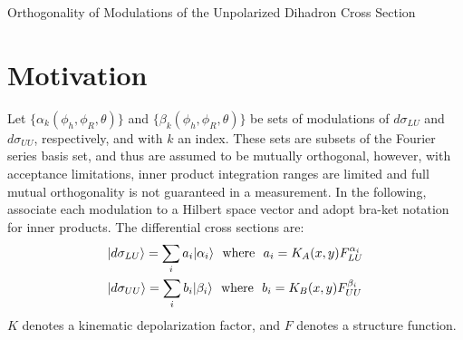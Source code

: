 \documentclass[12pt]{article}
\begin{document}
\begin{center}
{\LARGE 
Orthogonality of Modulations of the Unpolarized Dihadron Cross Section
}
\end{center}


\section*{Motivation}

Let $\{\alpha_k(\phi_h,\phi_R,\theta)\}$ and $\{\beta_k(\phi_h,\phi_R,\theta)\}$
be sets of modulations of $d\sigma_{LU}$ and $d\sigma_{UU}$, respectively, and
with $k$ an index. These sets are subsets of the Fourier series basis set, and
thus are assumed to be mutually orthogonal, however, with acceptance
limitations, inner product integration ranges are limited and full mutual
orthogonality is not guaranteed in a measurement. In the following, associate
each modulation to a Hilbert space vector and adopt bra-ket notation for inner
products. The differential cross sections are:
\begin{align}
\displaystyle
&|d\sigma_{LU}\rangle=\sum_{i}{a_i|\alpha_i\rangle}~ ~\text{where}~ ~
a_i=K_A(x,y)F_{LU}^{\alpha_i}\\
&|d\sigma_{UU}\rangle=\sum_{i}{b_i|\beta_i\rangle}~ ~\text{where}~ ~
b_i=K_B(x,y)F_{UU}^{\beta_i}
\end{align}
$K$ denotes a kinematic depolarization factor, and $F$ denotes a structure function.
\end{document}
